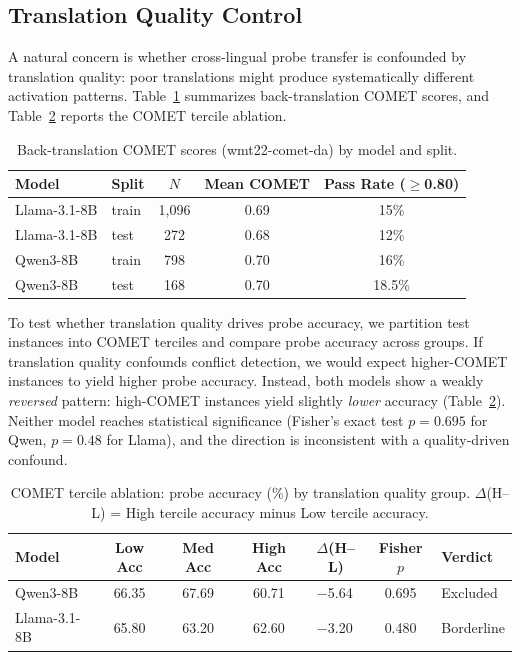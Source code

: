 \documentclass[11pt]{article}
\newcommand{\pp}{\,\text{pp}}
\begin{document}
\subsection{Translation Quality Control}
\label{sec:comet}

A natural concern is whether cross-lingual probe transfer is confounded by translation quality: poor translations might produce systematically different activation patterns.
Table~\ref{tab:comet} summarizes back-translation COMET scores, and Table~\ref{tab:comet_ablation} reports the COMET tercile ablation.

\begin{table}[t]
\centering
\caption{Back-translation COMET scores (wmt22-comet-da) by model and split.}
\label{tab:comet}
\begin{tabular}{llccc}
\toprule
Model & Split & $N$ & Mean COMET & Pass Rate ($\geq$0.80) \\
\midrule
Llama-3.1-8B & train & 1,096 & 0.69 & 15\% \\
Llama-3.1-8B & test  & 272   & 0.68 & 12\% \\
Qwen3-8B     & train & 798   & 0.70 & 16\% \\
Qwen3-8B     & test  & 168   & 0.70 & 18.5\% \\
\bottomrule
\end{tabular}
\end{table}

To test whether translation quality drives probe accuracy, we partition test instances into COMET terciles and compare probe accuracy across groups.
If translation quality confounds conflict detection, we would expect higher-COMET instances to yield higher probe accuracy.
Instead, both models show a weakly \emph{reversed} pattern: high-COMET instances yield slightly \emph{lower} accuracy (Table~\ref{tab:comet_ablation}).
Neither model reaches statistical significance (Fisher's exact test $p = 0.695$ for Qwen, $p = 0.48$ for Llama), and the direction is inconsistent with a quality-driven confound.

\begin{table}[t]
\centering
\caption{COMET tercile ablation: probe accuracy (\%) by translation quality group. $\Delta$(H--L) = High tercile accuracy minus Low tercile accuracy.}
\label{tab:comet_ablation}
\begin{tabular}{lcccccl}
\toprule
Model & Low Acc & Med Acc & High Acc & $\Delta$(H--L) & Fisher $p$ & Verdict \\
\midrule
Qwen3-8B     & 66.35 & 67.69 & 60.71 & $-$5.64\pp & 0.695 & Excluded \\
Llama-3.1-8B & 65.80 & 63.20 & 62.60 & $-$3.20\pp & 0.480 & Borderline \\
\bottomrule
\end{tabular}
\end{table}
\end{document}
